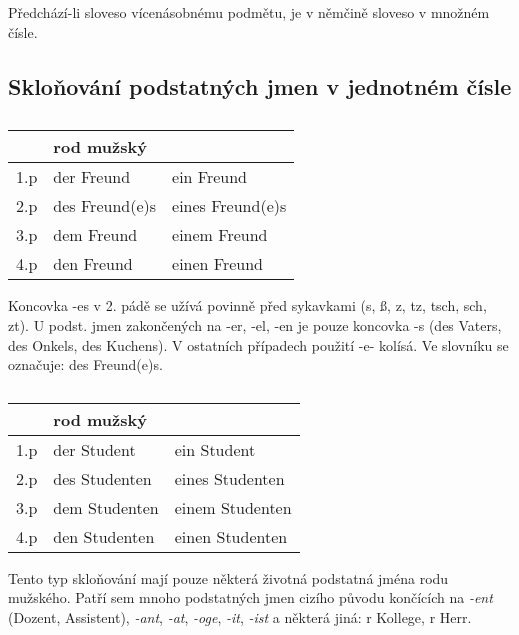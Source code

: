       Předchází-li sloveso vícenásobnému podmětu, je v němčině sloveso v množném čísle.
    
    \subsection*{Skloňování podstatných jmen v jednotném čísle}
      \begin{table}[ht!]
        \begin{tabular}{lll}  %
          \hline
               & rod mužský          &                       \\ 
          \hline
           1.p &   der Freund        & ein Freund            \\
           2.p &   des Freund(e)s    & eines Freund(e)s      \\
           3.p &   dem Freund        & einem Freund          \\
           4.p &   den Freund        & einen Freund          \\
        \end{tabular}
        \caption*{ }
      \end{table}
      Koncovka -es v 2. pádě se užívá povinně před sykavkami (s, ß, z, tz, tsch, sch, zt). U podst. 
      jmen zakončených na -er, -el, -en je pouze koncovka -s (des Vaters, des Onkels, des Kuchens). 
      V ostatních případech použití -e- kolísá. Ve slovníku se označuje: des Freund(e)s.
      
      \begin{table}[ht!]
        \begin{tabular}{lll}  %
          \hline
               & rod mužský            &                        \\ 
          \hline
           1.p &   der Student         & ein Student            \\
           2.p &   des Studenten       & eines Studenten        \\
           3.p &   dem Studenten       & einem Studenten        \\
           4.p &   den Studenten       & einen Studenten        \\
        \end{tabular}
        \caption*{ }
      \end{table}    
      Tento typ skloňování mají pouze některá životná podstatná jména rodu mužského. Patří sem 
      mnoho podstatných jmen cizího původu končících na \emph{-ent} (Dozent, Assistent), 
      \emph{-ant}, \emph{-at}, \emph{-oge}, \emph{-it}, \emph{-ist} a některá jiná: r Kollege, r 
      Herr.	
  
